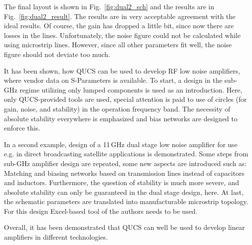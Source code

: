 The final layout is shown in Fig.~\ref{fig:dual2_sch} and the results
are in Fig.~\ref{fig:dual2_result}. The results are in very acceptable
agreement with the ideal results. Of course, the gain has dropped a
little bit, since now there are losses in the lines. Unfortunately,
the noise figure could not be calculated while using microstrip
lines. However, since all other parameters fit well, the noise figure
should not deviate too much.


It has been shown, how QUCS can be used to develop RF low noise
amplifiers, where vendor data on S-Parameters is available. To start,
a design in the sub-GHz regime utilizing only lumped components is
used as an introduction. Here, only QUCS-provided tools are used,
special attention is paid to use of circles (for gain, noise, and
stability) in the operation frequency band. The necessity of absolute
stability everywhere is emphasized and bias networks are designed to
enforce this. 

In a second example, design of a 11\,GHz  dual stage low noise amplifier for use
e.g. in direct broadcasting satellite applications is
demonstrated. Some steps from sub-GHz amplifier design are repeated,
some new aspects are introduced such as: Matching and biasing
networks based on transmission lines instead of capacitors and
inductors. Furthermore, the question of stability is much more severe,
and absolute stability can only be guaranteed in the dual stage
design, here. At last, the schematic parameters are translated into
manufacturable microstrip topology. For this design Excel-based tool
of the authors needs to be used. 

Overall, it has been demonstrated that QUCS can well be used to
develop linear amplifiers in different technologies. 


